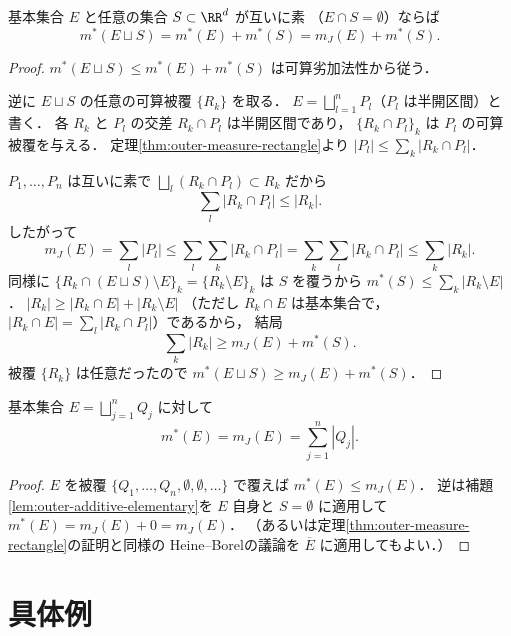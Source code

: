 \begin{lemma}[基本集合に対する加法性]\label{lem:outer-additive-elementary}
基本集合 $E$ と任意の集合 $S \subset \RR^d$ が互いに素
（$E \cap S = \emptyset$）ならば
\[
m^*(E \sqcup S) = m^*(E) + m^*(S) = m_J(E) + m^*(S).
\]
\end{lemma}
\begin{proof}
$m^*(E \sqcup S) \le m^*(E) + m^*(S)$
は可算劣加法性から従う．

逆に $E \sqcup S$ の任意の可算被覆 $\{R_k\}$ を取る．
$E = \bigsqcup_{l=1}^n P_l$（$P_l$ は半開区間）と書く．
各 $R_k$ と $P_l$ の交差 $R_k \cap P_l$ は半開区間であり，
$\{R_k \cap P_l\}_k$ は $P_l$ の可算被覆を与える．
定理\ref{thm:outer-measure-rectangle}より
$|P_l| \le \sum_k |R_k \cap P_l|$．

$P_1,\ldots,P_n$ は互いに素で
$\bigsqcup_l (R_k \cap P_l) \subset R_k$ だから
\[
\sum_l |R_k \cap P_l| \le |R_k|.
\]
したがって
\[
m_J(E) = \sum_l |P_l|
\le \sum_l \sum_k |R_k \cap P_l|
= \sum_k \sum_l |R_k \cap P_l|
\le \sum_k |R_k|.
\]
同様に $\{R_k \cap (E \sqcup S) \setminus E\}_k = \{R_k \setminus E\}_k$
は $S$ を覆うから $m^*(S) \le \sum_k |R_k \setminus E|$．
$|R_k| \ge |R_k \cap E| + |R_k \setminus E|$
（ただし $R_k \cap E$ は基本集合で，
$|R_k \cap E| = \sum_l |R_k \cap P_l|$）であるから，
結局
\[
\sum_k |R_k| \ge m_J(E) + m^*(S).
\]
被覆 $\{R_k\}$ は任意だったので
$m^*(E \sqcup S) \ge m_J(E) + m^*(S)$．
\end{proof}

\begin{corollary}\label{cor:outer-measure-elementary}
基本集合 $E = \bigsqcup_{j=1}^n Q_j$ に対して
\[
m^*(E) = m_J(E) = \sum_{j=1}^n |Q_j|.
\]
\end{corollary}
\begin{proof}
$E$ を被覆 $\{Q_1,\ldots,Q_n,\emptyset,\emptyset,\ldots\}$ で覆えば
$m^*(E) \le m_J(E)$．
逆は補題\ref{lem:outer-additive-elementary}を
$E$ 自身と $S = \emptyset$ に適用して
$m^*(E) = m_J(E) + 0 = m_J(E)$．
（あるいは定理\ref{thm:outer-measure-rectangle}の証明と同様の
Heine--Borelの議論を $\overline{E}$ に適用してもよい．）
\end{proof}

\section{具体例}\label{sec:lebesgue-outer-examples}


